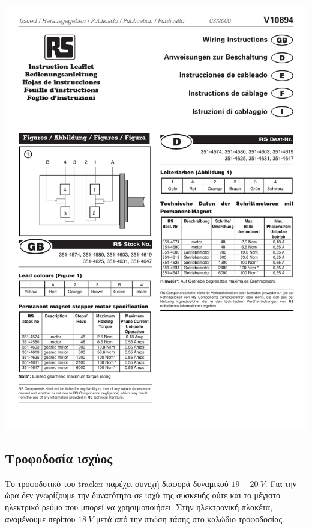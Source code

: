\documentclass[
  a4paper,
  twoside,
  titlepage,
  11pt]{article}
\numberwithin{equation}{section}
\numberwithin{figure}{section}
\numberwithin{table}{section}
\begin{document}
\begin{center}\includegraphics[width=1\linewidth]{./files/FWmotor_wiring} \end{center}

\hypertarget{ux3c4ux3c1ux3bfux3c6ux3bfux3b4ux3bfux3c3ux3afux3b1-ux3b9ux3c3ux3c7ux3cdux3bfux3c2}{%
\subsection{Τροφοδοσία ισχύος}\label{ux3c4ux3c1ux3bfux3c6ux3bfux3b4ux3bfux3c3ux3afux3b1-ux3b9ux3c3ux3c7ux3cdux3bfux3c2}}

Το τροφοδοτικό του tracker παρέχει συνεχή διαφορά δυναμικού \(19-20\ V\). Για την ώρα δεν γνωρίζουμε την δυνατότητα σε ισχύ της συσκευής ούτε και το μέγιστο ηλεκτρικό ρεύμα που μπορεί να χρησιμοποιήσει.
Στην ηλεκτρονική πλακέτα, αναμένουμε περίπου \(18\ V\) μετά από την πτώση τάσης στο καλώδιο τροφοδοσίας.
\end{document}

